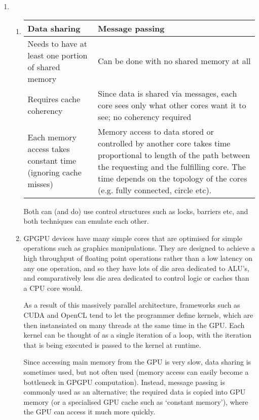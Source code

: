 \documentclass{report}
\begin{document}
\begin{enumerate}
\item
  \begin{enumerate}
  \item
    \begin{tabularx}{\textwidth}{X|X}
      Data sharing & Message passing\\ \hline
      
      Needs to have at least one portion of shared memory & Can be
      done with no shared memory at all\\
      
      Requires cache coherency & Since data is shared via messages,
      each core sees only what other cores want it to see; no
      coherency required\\

      
      Each memory access takes constant time (ignoring cache misses) &
      Memory access to data stored or controlled by another core takes
      time proportional to length of the path between the requesting
      and the fulfilling core. The time depends on the topology of the
      cores (e.g. fully connected, circle etc).
    \end{tabularx}

    Both can (and do) use control structures such as locks, barriers
    etc, and both techniques can emulate each other.
  \item GPGPU devices have many simple cores that are optimised for
    simple operations such as graphics manipulations. They are
    designed to achieve a high throughput of floating point operations
    rather than a low latency on any one operation, and so they have
    lots of die area dedicated to ALU's, and comparatively less die
    area dedicated to control logic or caches than a CPU core would.

    As a result of this massively parallel architecture, frameworks
    such as CUDA and OpenCL tend to let the programmer define kernels,
    which are then instansiated on many threads at the same time in
    the GPU. Each kernel can be thought of as a single iteration of a
    loop, with the iteration that is being executed is passed to the
    kernel at runtime.

    Since accessing main memory from the GPU is very slow, data
    sharing is sometimes used, but not often used (memory access can
    easily become a bottleneck in GPGPU computation). Instead, message
    passing is commonly used as an alternative; the required data is
    copied into GPU memory (or a specialised GPU cache such as
    `constant memory'), where the GPU can access it much more quickly.


\end{enumerate}
\end{enumerate}
\end{document}
